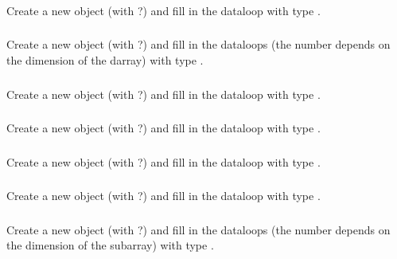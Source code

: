 \documentclass{article}
\begin{document}
\subsubsection{}
Create a new object (with ?) and fill in the dataloop
with type .

\subsubsection{}
Create a new object (with ?) and fill in the
dataloops (the number depends on the dimension of the darray) 
with type .

\subsubsection{}
Create a new object (with ?) and fill in the dataloop
with type .

\subsubsection{}
Create a new object (with ?) and fill in the dataloop
with type .

\subsubsection{}
Create a new object (with ?) and fill in the dataloop
with type .

\subsubsection{}
Create a new object (with ?) and fill in the dataloop
with type .

\subsubsection{}
Create a new object (with ?) and fill in the
dataloops (the number depends on the dimension of the subarray) 
with type .
\end{document}
